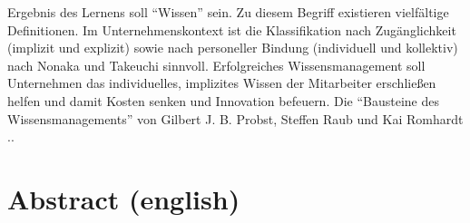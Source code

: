 \documentclass[12pt]{article}
\begin{document}

Ergebnis des Lernens soll ``Wissen'' sein. Zu diesem Begriff existieren
vielfältige Definitionen. Im Unternehmenskontext ist die Klassifikation 
nach Zugänglichkeit (implizit und explizit) sowie nach personeller Bindung 
(individuell und kollektiv) nach Nonaka und Takeuchi \cite{Nonaka:1997}  sinnvoll.
Erfolgreiches Wissensmanagement soll Unternehmen das individuelles, implizites Wissen 
der Mitarbeiter erschließen helfen und damit Kosten senken und Innovation befeuern.
Die ``Bausteine des Wissensmanagements'' von Gilbert J. B. Probst, Steffen Raub und
Kai Romhardt \cite{Probst:2006} ..


\section{Abstract (english)}

\nocite{*}


\end{document}
